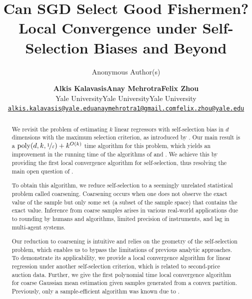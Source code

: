 \documentclass[11pt,letterpaper]{article}
\title{
    Can SGD Select Good Fishermen?\\
    Local Convergence under Self-Selection Biases and Beyond
}
\author{Anonymous Author(s)}
\author{
        \begin{tabular}{C{5.1cm}C{5.1cm}C{5.1cm}}
        {\bf Alkis Kalavasis} 
            & {\bf Anay Mehrotra} 
                & {\bf Felix Zhou}\\[2mm]
        {Yale University} 
            & {Yale University} 
                & {Yale University}\\[1mm]
        \mbox{\small\texttt{\href{mailto:alkis.kalavasis@yale.edu}{alkis.kalavasis@yale.edu}}} 
            & \mbox{\small\texttt{\href{mailto:anaymehrotra1@gmail.com}{anaymehrotra1@gmail.com}}}
                & \mbox{\small\texttt{\href{felix.zhou@yale.edu}{felix.zhou@yale.edu}}}
        \\
        \end{tabular}
}
\date{}
\theoremstyle{plain}
\theoremstyle{definition}
\theoremstyle{remark}
\newcommand{\nfrac}[2]{\nicefrac{#1}{#2}}
\newcommand{\poly}{\mathrm{poly}}
\newcommand{\eps}{\varepsilon}
\newcommand{\negsep}{\vspace{0mm}}
\begin{document}
\maketitle
\thispagestyle{empty}

\begin{abstract}
    We revisit the problem of estimating $k$ linear regressors with self-selection bias in $d$ dimensions with the maximum selection criterion, as introduced by \citet[STOC'23]{cherapanamjeri2023selfselection}. 
    Our main result  
    is a $\poly(d,k,\nfrac{1}{\eps}) + {k}^{O(k)}$ time algorithm for this problem, 
    which yields an improvement in the running time of the algorithms of \cite{cherapanamjeri2023selfselection} and \citet[arXiv]{gaitonde2024selfselection}. We achieve this by providing the first local convergence algorithm for self-selection, thus resolving the main open question of \cite{cherapanamjeri2023selfselection}.

    To obtain this algorithm, we 
    reduce self-selection to a seemingly unrelated statistical problem called coarsening. Coarsening occurs when one does not observe the exact value of the sample but only some
    set (a subset of the sample space) that contains the exact value. 
    Inference from coarse samples arises in various real-world applications due to rounding by humans and algorithms, limited precision of instruments, and lag in multi-agent systems.  

    Our reduction to coarsening is intuitive and relies on the geometry of the self-selection problem, which enables us to bypass the limitations of previous analytic approaches. To demonstrate its applicability, we provide a local convergence algorithm for linear regression under another self-selection criterion, which is related to second-price auction data. 
    Further, we give the first polynomial time local convergence algorithm for coarse Gaussian mean estimation given samples generated from a convex partition. Previously, only a sample-efficient algorithm was known 
    due to \citet[COLT'21]{fotakis2021coarse}.
\end{abstract}

\newpage 
\thispagestyle{empty}
\setcounter{tocdepth}{3}
{   
    \tableofcontents
}
\thispagestyle{empty}
\newpage


\negsep{}
\end{document}
